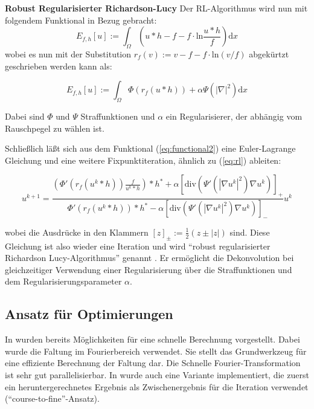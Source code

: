 \documentclass[a4paper,12pt]{article}
\begin{document}
\textbf{Robust Regularisierter Richardson-Lucy} \cite{rrrl}
Der RL-Algorithmus wird nun mit folgendem Funktional in Bezug gebracht:
\begin{equation} \label{eq:functional1}
E_{f,h}[u]:=\int_\Omega \left (u*h-f-f \cdot \mathrm{ln} \frac{u*h}{f}  \right )\mathrm{d}x
\end{equation}
wobei es nun mit der Substitution $r_f(v):=v-f-f \cdot \mathrm{ln}(v/f)$
abgekürtzt geschrieben werden kann als:

\begin{equation} \label{eq:functional2}
E_{f,h}[u]:=\int_\Omega \Phi(r_f(u*h))+ \alpha \Psi (|\nabla|^2) \mathrm{d}x 
\end{equation}

Dabei sind $\Phi$ und $\Psi$ Straffunktionen und $\alpha$ ein Regularisierer,
der abhängig vom Rauschpegel zu wählen ist.

Schließlich läßt sich aus dem Funktional
(\ref{eq:functional2}) eine Euler-Lagrange Gleichung und eine weitere
Fixpunktiteration, ähnlich zu (\ref{eq:rl}) ableiten:


\begin{equation} \label{eq:rrrl}
u^{k+1} = \frac{(\Phi' (r_f(u^k *h))\frac{f}{u^k*h})*h^*+\alpha
[\mathrm{div}(\Psi'(|\nabla u^k|^2) \nabla u^k )]_+}{\Phi'
(r_f(u^k*h))*h^*-\alpha[\mathrm{div}(\Psi'(|\nabla u^k |^2)\nabla u^k)]_-}u^k
\end{equation}

wobei die Ausdrücke in den Klammern $[z]_\pm := \frac{1}{2}(z\pm |z|)$ sind.
Diese Gleichung ist also wieder eine Iteration und wird "`robust regularisierter
Richardson Lucy-Algorithmus"' genannt \cite{rrrl}. Er ermöglicht die
Dekonvolution bei gleichzeitiger Verwendung einer Regularisierung über die
Straffunktionen und dem Regularisierungsparameter $\alpha$.









 

\subsection{Ansatz für Optimierungen}
In \cite{rrrl} wurden bereits Möglichkeiten für eine schnelle Berechnung
vorgestellt. Dabei wurde die Faltung im Fourierbereich verwendet. Sie stellt das
Grundwerkzeug für eine effiziente Berechnung der Faltung dar. Die Schnelle
Fourier-Transformation ist sehr gut pa\-ral\-lelisier\-bar. In \cite{rrrl} wurde
auch eine Variante implementiert, die zuerst ein heruntergerechnetes Ergebnis als
Zwischenergebnis für die Iteration verwendet ("`course-to-fine"'-Ansatz).
\end{document}
